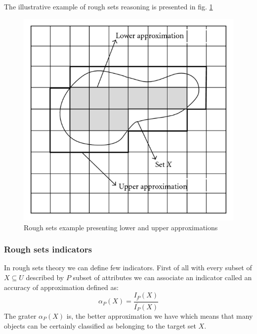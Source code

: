 The illustrative example of rough sets reasoning is presented in fig. \ref{fig:rough_set_example}
\begin{figure}[H] 
    \begin{center}
        \includegraphics{fig/rough_set.png}
    \end{center}
    \caption{Rough sets example presenting lower and upper approximations}
    \label{fig:rough_set_example}
\end{figure}

\subsubsection{Rough sets indicators}
\label{cha:Rough_sets_indicators}
In rough sets theory we can define few indicators. First of all with every 
subset of $X \subseteq U$ described by $P$ subset of attributes we can 
associate an indicator called an accuracy of approximation defined as:
\begin{equation}
    \alpha_P(X)=\frac{\underline{I_P}(X)}{\overline{I_P}(X)}
    \label{eq:accuracy_approximation}
\end{equation}
The grater $\alpha_P(X)$ is, the better approximation we have which means that
many objects can be certainly classified as belonging to the target set $X$.

